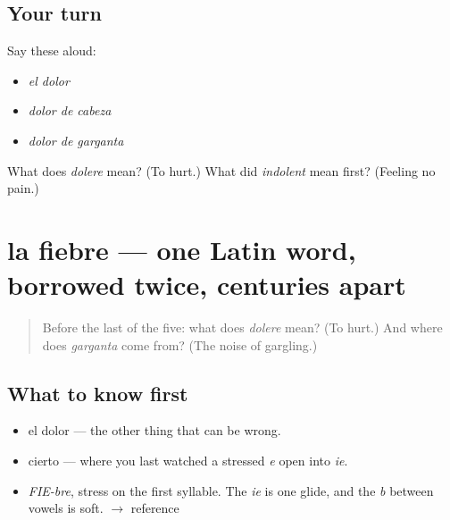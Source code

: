 \subsection*{Your turn}
Say these aloud:

\begin{itemize}
\raggedright
  \item \emph{el dolor}
  \item \emph{dolor de cabeza}
  \item \emph{dolor de garganta}
\end{itemize}

\begin{tcolorbox}[breakable,colback=teal!4,colframe=teal!35!black,title={Before you move on}]
What does \emph{dolere} mean? (To hurt.) What did \emph{indolent} mean first? (Feeling no pain.)
\end{tcolorbox}
\section[la fiebre]{la fiebre — one Latin word, borrowed twice, centuries apart}

\label{lesson:ES-C286-fiebre}



\begin{quote}
Before the last of the five: what does \emph{dolere} mean? (To hurt.) And where does \emph{garganta} come from? (The noise of gargling.)
\end{quote}

\subsection*{What to know first}
\begin{itemize}
\raggedright
  \item el dolor — the other thing that can be wrong.
  \item cierto — where you last watched a stressed \emph{e} open into \emph{ie}.
\end{itemize}

\begin{sounds}
\begin{itemize}
\raggedright
  \item \emph{FIE-bre}, stress on the first syllable. The \emph{ie} is one glide, and the \emph{b} between vowels is soft. $\to$ reference
\end{itemize}
\end{sounds}

